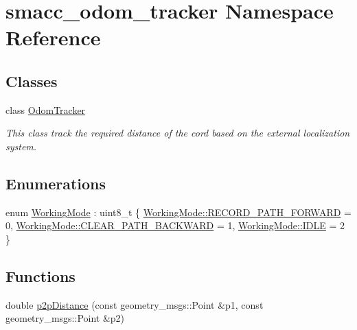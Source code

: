\hypertarget{namespacesmacc__odom__tracker}{}\section{smacc\+\_\+odom\+\_\+tracker Namespace Reference}
\label{namespacesmacc__odom__tracker}
\subsection*{Classes}
\begin{DoxyCompactItemize}
\item 
class \hyperlink{classsmacc__odom__tracker_1_1OdomTracker}{Odom\+Tracker}
\begin{DoxyCompactList}\small\item\em This class track the required distance of the cord based on the external localization system. \end{DoxyCompactList}\end{DoxyCompactItemize}
\subsection*{Enumerations}
\begin{DoxyCompactItemize}
\item 
enum \hyperlink{namespacesmacc__odom__tracker_ade9730dd5cc10ccfad9362176cf46c33}{Working\+Mode} \+: uint8\+\_\+t \{ \hyperlink{namespacesmacc__odom__tracker_ade9730dd5cc10ccfad9362176cf46c33a989d06a586bcf9520889228da7faa643}{Working\+Mode\+::\+R\+E\+C\+O\+R\+D\+\_\+\+P\+A\+T\+H\+\_\+\+F\+O\+R\+W\+A\+RD} = 0, 
\hyperlink{namespacesmacc__odom__tracker_ade9730dd5cc10ccfad9362176cf46c33a0cf8f27617189e35619df3c18bda6274}{Working\+Mode\+::\+C\+L\+E\+A\+R\+\_\+\+P\+A\+T\+H\+\_\+\+B\+A\+C\+K\+W\+A\+RD} = 1, 
\hyperlink{namespacesmacc__odom__tracker_ade9730dd5cc10ccfad9362176cf46c33aa5daf7f2ebbba4975d61dab1c40188c7}{Working\+Mode\+::\+I\+D\+LE} = 2
 \}
\end{DoxyCompactItemize}
\subsection*{Functions}
\begin{DoxyCompactItemize}
\item 
double \hyperlink{namespacesmacc__odom__tracker_a93496d9bf987249b884e9b0e60778a11}{p2p\+Distance} (const geometry\+\_\+msgs\+::\+Point \&p1, const geometry\+\_\+msgs\+::\+Point \&p2)
\end{DoxyCompactItemize}


